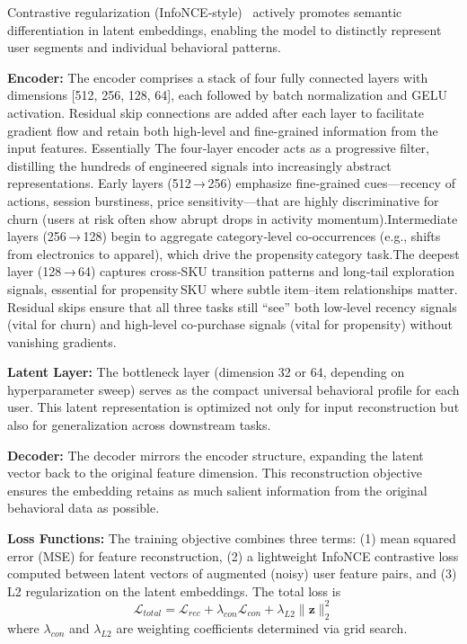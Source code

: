 \documentclass[sigconf]{acmart}
\begin{document}
Contrastive regularization (InfoNCE-style)~\cite{Oord2018} actively promotes semantic differentiation in latent embeddings, enabling the model to distinctly represent user segments and individual behavioral patterns.

\textbf{Encoder:}  
The encoder comprises a stack of four fully connected layers with dimensions [512, 256, 128, 64], each followed by batch normalization and GELU activation. Residual skip connections are added after each layer to facilitate gradient flow and retain both high-level and fine-grained information from the input features. Essentially The four‐layer encoder acts as a progressive filter, distilling the hundreds of engineered signals into increasingly abstract representations.
Early layers (512 → 256) emphasize fine‑grained cues—recency of actions, session burstiness, price sensitivity—that are highly discriminative for churn (users at risk often show abrupt drops in activity momentum).Intermediate layers (256 → 128) begin to aggregate category‑level co‑occurrences (e.g., shifts from electronics to apparel), which drive the propensity category task.The deepest layer (128 → 64) captures cross‑SKU transition patterns and long‑tail exploration signals, essential for propensity SKU where subtle item–item relationships matter.
Residual skips ensure that all three tasks still “see” both low‑level recency signals (vital for churn) and high‑level co‑purchase signals (vital for propensity) without vanishing gradients.

\textbf{Latent Layer:}  
The bottleneck layer (dimension 32 or 64, depending on hyperparameter sweep) serves as the compact universal behavioral profile for each user. This latent representation is optimized not only for input reconstruction but also for generalization across downstream tasks.

\textbf{Decoder:}  
The decoder mirrors the encoder structure, expanding the latent vector back to the original feature dimension. This reconstruction objective ensures the embedding retains as much salient information from the original behavioral data as possible.

\textbf{Loss Functions:}  
The training objective combines three terms: (1) mean squared error (MSE) for feature reconstruction, (2) a lightweight InfoNCE contrastive loss computed between latent vectors of augmented (noisy) user feature pairs, and (3) L2 regularization on the latent embeddings. The total loss is  
\[
\mathcal{L}_{total} = \mathcal{L}_{rec} + \lambda_{con}\mathcal{L}_{con} + \lambda_{L2}\|\mathbf{z}\|_2^2
\]  
where $\lambda_{con}$ and $\lambda_{L2}$ are weighting coefficients determined via grid search.
\end{document}
